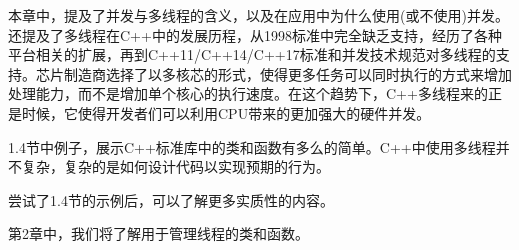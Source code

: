 
本章中，提及了并发与多线程的含义，以及在应用中为什么使用(或不使用)并发。还提及了多线程在C++中的发展历程，从1998标准中完全缺乏支持，经历了各种平台相关的扩展，再到C++11/C++14/C++17标准和并发技术规范对多线程的支持。芯片制造商选择了以多核芯的形式，使得更多任务可以同时执行的方式来增加处理能力，而不是增加单个核心的执行速度。在这个趋势下，C++多线程来的正是时候，它使得开发者们可以利用CPU带来的更加强大的硬件并发。

1.4节中例子，展示C++标准库中的类和函数有多么的简单。C++中使用多线程并不复杂，复杂的是如何设计代码以实现预期的行为。

尝试了1.4节的示例后，可以了解更多实质性的内容。

第2章中，我们将了解用于管理线程的类和函数。
